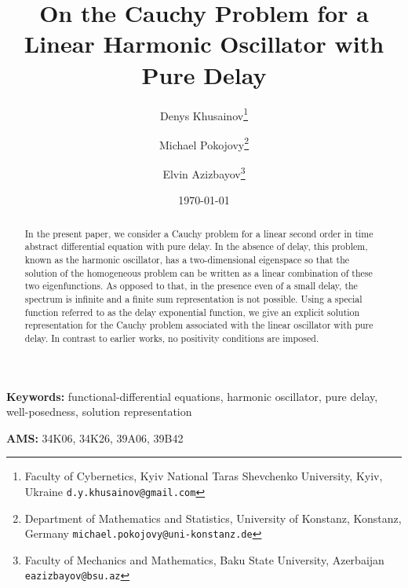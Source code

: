 \documentclass[12pt]{article}
\numberwithin{equation}{section}
\numberwithin{equation}{section}
\begin{document}
\title{On the Cauchy Problem for a Linear Harmonic Oscillator with Pure Delay}

\author{
Denys Khusainov\thanks{Faculty of Cybernetics, Kyiv National Taras Shevchenko University, Kyiv, Ukraine \hfill
\texttt{d.y.khusainov@gmail.com}} \and
Michael Pokojovy\thanks{Department of Mathematics and Statistics, University of Konstanz, Konstanz, Germany \hfill \texttt{michael.pokojovy@uni-konstanz.de}} \and
Elvin Azizbayov\thanks{Faculty of Mechanics and Mathematics, Baku State University, Azerbaijan \hfill
\texttt{eazizbayov@bsu.az}}
}

\date{\today}

\maketitle

\begin{abstract}
	In the present paper, we consider a Cauchy problem for a linear second order in time abstract differential equation with pure delay.
	In the absence of delay, this problem, known as the harmonic oscillator, has a two-dimensional eigenspace 
	so that the solution of the homogeneous problem can be written as a linear combination of these two eigenfunctions. 
	As opposed to that, in the presence even of a small delay, the spectrum is infinite and a finite sum representation is not possible.
	Using a special function referred to as the delay exponential function,
	we give an explicit solution representation for the Cauchy problem associated with the linear oscillator with pure delay. 
	In contrast to earlier works, no positivity conditions are imposed.
\end{abstract}

{\bf Keywords: } functional-differential equations, harmonic oscillator, pure delay, well-posedness, solution representation

{\bf AMS: }
 	34K06, 
	34K26, 
	39A06, 
 	39B42  

\pagestyle{myheadings}
\thispagestyle{plain}
\end{document}
